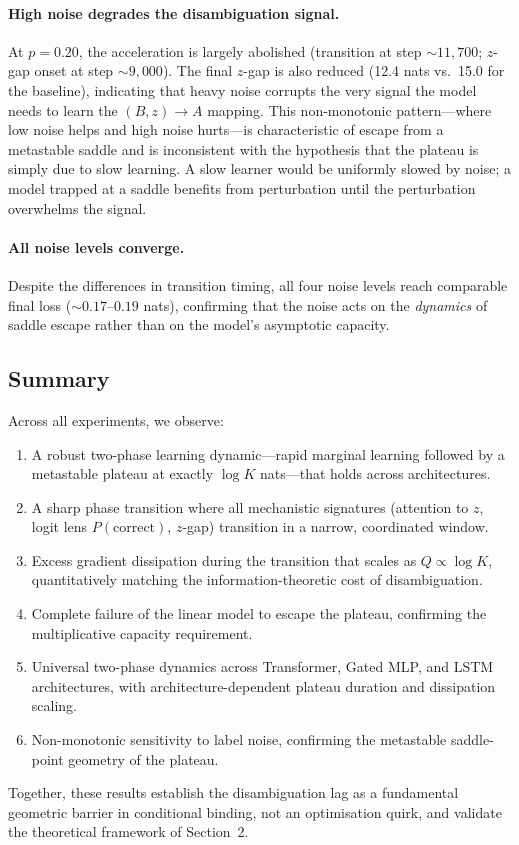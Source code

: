 \paragraph{High noise degrades the disambiguation signal.}
At $p = 0.20$, the acceleration is largely abolished (transition at step ${\sim}11{,}700$; $z$-gap onset at step ${\sim}9{,}000$). The final $z$-gap is also reduced (12.4 nats vs.\ 15.0 for the baseline), indicating that heavy noise corrupts the very signal the model needs to learn the $(B, z) \to A$ mapping. This non-monotonic pattern---where low noise helps and high noise hurts---is characteristic of escape from a metastable saddle and is inconsistent with the hypothesis that the plateau is simply due to slow learning. A slow learner would be uniformly slowed by noise; a model trapped at a saddle benefits from perturbation until the perturbation overwhelms the signal.

\paragraph{All noise levels converge.}
Despite the differences in transition timing, all four noise levels reach comparable final loss (${\sim}0.17$--$0.19$ nats), confirming that the noise acts on the \emph{dynamics} of saddle escape rather than on the model's asymptotic capacity.

\subsection{Summary}

Across all experiments, we observe:
\begin{enumerate}
    \item A robust two-phase learning dynamic---rapid marginal learning followed by a metastable plateau at exactly $\log K$ nats---that holds across architectures.
    \item A sharp phase transition where all mechanistic signatures (attention to $z$, logit lens $P(\text{correct})$, $z$-gap) transition in a narrow, coordinated window.
    \item Excess gradient dissipation during the transition that scales as $Q \propto \log K$, quantitatively matching the information-theoretic cost of disambiguation.
    \item Complete failure of the linear model to escape the plateau, confirming the multiplicative capacity requirement.
    \item Universal two-phase dynamics across Transformer, Gated MLP, and LSTM architectures, with architecture-dependent plateau duration and dissipation scaling.
    \item Non-monotonic sensitivity to label noise, confirming the metastable saddle-point geometry of the plateau.
\end{enumerate}
Together, these results establish the disambiguation lag as a fundamental geometric barrier in conditional binding, not an optimisation quirk, and validate the theoretical framework of Section~2.
